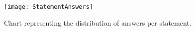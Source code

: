 \begin{figure}[t]
  \texttt{[image: StatementAnswers]}
  \caption[Statement results]{Chart representing the distribution of answers per statement.}
  \label{fig:statementresult}
  \centering
\end{figure}